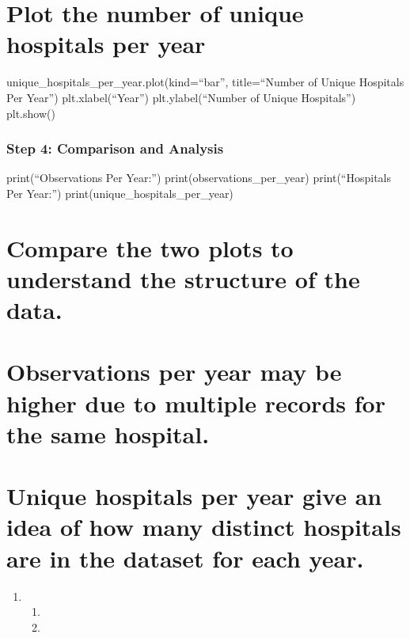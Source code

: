 \documentclass[
  letterpaper,
  DIV=11,
  numbers=noendperiod]{scrartcl}
\providecommand{\tightlist}{%
  \setlength{\itemsep}{0pt}\setlength{\parskip}{0pt}}\usepackage{longtable,booktabs,array}
\begin{document}
\section{Plot the number of unique hospitals per
year}\label{plot-the-number-of-unique-hospitals-per-year}

unique\_hospitals\_per\_year.plot(kind=``bar'', title=``Number of Unique
Hospitals Per Year'') plt.xlabel(``Year'') plt.ylabel(``Number of Unique
Hospitals'') plt.show()

\subsubsection{Step 4: Comparison and
Analysis}\label{step-4-comparison-and-analysis}

print(``Observations Per Year:'') print(observations\_per\_year)
print(``\nUnique Hospitals Per Year:'')
print(unique\_hospitals\_per\_year)

\section{Compare the two plots to understand the structure of the
data.}\label{compare-the-two-plots-to-understand-the-structure-of-the-data.}

\section{Observations per year may be higher due to multiple records for
the same
hospital.}\label{observations-per-year-may-be-higher-due-to-multiple-records-for-the-same-hospital.}

\section{Unique hospitals per year give an idea of how many distinct
hospitals are in the dataset for each
year.}\label{unique-hospitals-per-year-give-an-idea-of-how-many-distinct-hospitals-are-in-the-dataset-for-each-year.}

\begin{enumerate}
\def\labelenumi{\arabic{enumi}.}
\setcounter{enumi}{3}
\tightlist
\item
  \begin{enumerate}
  \def\labelenumii{\alph{enumii}.}
  \tightlist
  \item
  \item
  \end{enumerate}
\end{enumerate}
\end{document}
